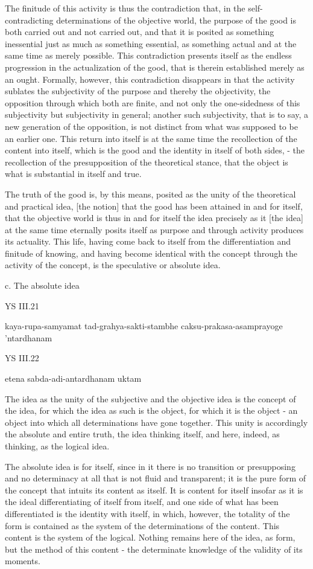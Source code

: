 The finitude of this activity is thus the contradiction that, in the self-
contradicting determinations of the objective world, the purpose of the good
is both carried out and not carried out, and that it is posited as something
inessential just as much as something essential, as something actual and at
the same time as merely possible. This contradiction presents itself as the
endless progression in the actualization of the good, that is therein established
merely as an ought. Formally, however, this contradiction disappears in
that the activity sublates the subjectivity of the purpose and thereby the
objectivity, the opposition through which both are finite, and not only the
one-sidedness of this subjectivity but subjectivity in general; another such
subjectivity, that is to say, a new generation of the opposition, is not distinct
from what was supposed to be an earlier one. This return into itself is at
the same time the recollection of the content into itself, which
is the good and the identity in itself  of both
sides, - the recollection of the presupposition of the theoretical stance,
that the object is what is substantial in itself and true.

The truth of the good is, by this means, posited as
the unity of the theoretical and practical idea,
[the notion] that the good has been attained in and for itself,
that the objective world is thus in and for itself the idea precisely as
it [the idea] at the same time eternally posits itself as purpose and
through activity produces its actuality.
This life, having come back to itself from
the differentiation and finitude of knowing,
and having become identical with the concept
through the activity of the concept,
is the speculative or absolute idea.

c. The absolute idea

YS III.21

kaya-rupa-samyamat tad-grahya-sakti-stambhe
caksu-prakasa-asamprayoge 'ntardhanam

YS III.22

etena sabda-adi-antardhanam uktam

The idea as the unity of the subjective and the objective idea is
the concept of the idea, for which the idea as such is the object,
for which it is the object - an object into which all determinations have gone together.
This unity is accordingly the absolute and entire truth,
the idea thinking itself, and here, indeed, as thinking, as the logical idea.

The absolute idea is for itself, since in it there is no transition or presupposing
and no determinacy at all that is not fluid and transparent;
it is the pure form of the concept that intuits its content as itself.
It is content for itself insofar as it is the ideal differentiating of
itself from itself, and one side of what has been differentiated is
the identity with itself, in which, however, the totality of the form is
contained as the system of the determinations of the content.
This content is the system of the logical.
Nothing remains here of the idea, as form, but the method of this content -
the determinate knowledge of the validity of its moments.

